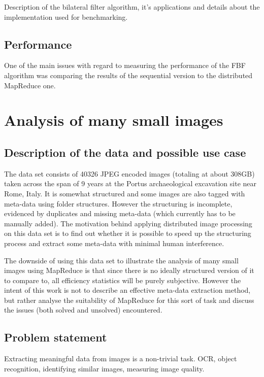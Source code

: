 \documentclass [12pt,a4paper]{report}
\begin{document}
Description of the bilateral filter algorithm, it's applications and details about the implementation used for benchmarking.

\subsection{Performance}

One of the main issues with regard to measuring the performance of the FBF algorithm was comparing the results of the sequential version to the distributed MapReduce one.

\section{Analysis of many small images}

\subsection{Description of the data and possible use case}

The data set consists of 40326 JPEG encoded images (totaling at about 308GB) taken across the span of 9 years at the Portus archaeological excavation site near Rome, Italy. It is somewhat structured and some images are also tagged with meta-data using folder structures. However the structuring is incomplete, evidenced by duplicates and missing meta-data (which currently has to be manually added). The motivation behind applying distributed image processing on this data set is to find out whether it is possible to speed up the structuring process and extract some meta-data with minimal human interference.

The downside of using this data set to illustrate the analysis of many small images using MapReduce is that since there is no ideally structured version of it to compare to, all efficiency statistics will be purely subjective. However the intent of this work is not to describe an effective meta-data extraction method, but rather analyse the suitability of MapReduce for this sort of task and discuss the issues (both solved and unsolved) encountered.

\subsection{Problem statement}

Extracting meaningful data from images is a non-trivial task. OCR, object recognition, identifying similar images, measuring image quality.
\end{document}
